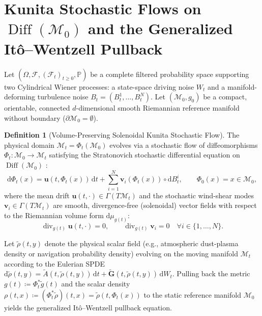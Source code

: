 \documentclass[11pt,a4paper,reqno]{article}
\theoremstyle{definition}
\newtheorem{definition}[theorem]{Definition}
\theoremstyle{remark}
\begin{document}
\section{Kunita Stochastic Flows on $\operatorname{Diff}(\mathcal{M}_0)$ and the Generalized It\^o--Wentzell Pullback}

Let $(\Omega, \mathcal{F}, (\mathcal{F}_t)_{t \ge 0}, \mathbb{P})$ be a complete filtered probability space supporting two Cylindrical Wiener processes: a state-space driving noise $W_t$ and a manifold-deforming turbulence noise $B_t = (B_t^1, \dots, B_t^N)$. Let $(\mathcal{M}_0, g_0)$ be a compact, orientable, connected $d$-dimensional smooth Riemannian reference manifold without boundary ($\partial\mathcal{M}_0 = \emptyset$).

\begin{definition}[Volume-Preserving Solenoidal Kunita Stochastic Flow]
The physical domain $\mathcal{M}_t = \Phi_t(\mathcal{M}_0)$ evolves via a stochastic flow of diffeomorphisms $\Phi_t : \mathcal{M}_0 \to \mathcal{M}_t$ satisfying the Stratonovich stochastic differential equation on $\operatorname{Diff}(\mathcal{M}_0)$ \cite{kunita1990stochastic, baxendale1984brownian}:
\begin{equation}\label{eq:kunita_flow}
  \mathrm{d}\Phi_t(x) = \mathbf{u}(t, \Phi_t(x))\,\mathrm{d}t + \sum_{i=1}^N \mathbf{v}_i(\Phi_t(x)) \circ \mathrm{d}B_t^i, \qquad \Phi_0(x) = x \in \mathcal{M}_0,
\end{equation}
where the mean drift $\mathbf{u}(t,\cdot) \in \Gamma(T\mathcal{M}_t)$ and the stochastic wind-shear modes $\mathbf{v}_i \in \Gamma(T\mathcal{M}_t)$ are smooth, divergence-free (solenoidal) vector fields with respect to the Riemannian volume form $\mathrm{d}\mu_{g(t)}$:
\begin{equation}\label{eq:solenoidal_cond}
  \operatorname{div}_{g(t)} \mathbf{u}(t, \cdot) = 0, \qquad \operatorname{div}_{g(t)} \mathbf{v}_i = 0 \quad \forall i \in \{1, \dots, N\}.
\end{equation}
\end{definition}

Let $\tilde{\rho}(t, y)$ denote the physical scalar field (e.g., atmospheric dust-plasma density or navigation probability density) evolving on the moving manifold $\mathcal{M}_t$ according to the Eulerian SPDE $\mathrm{d}\tilde{\rho}(t,y) = \tilde{A}(t,\tilde{\rho}(t,y))\,\mathrm{d}t + \tilde{\mathbf{G}}(t,\tilde{\rho}(t,y))\,\mathrm{d}W_t$. Pulling back the metric $g(t) \coloneqq \Phi_t^* \tilde{g}(t)$ and the scalar density $\rho(t, x) \coloneqq (\Phi_t^* \tilde{\rho})(t, x) = \tilde{\rho}(t, \Phi_t(x))$ to the static reference manifold $\mathcal{M}_0$ yields the generalized It\^o--Wentzell pullback equation.
\end{document}
